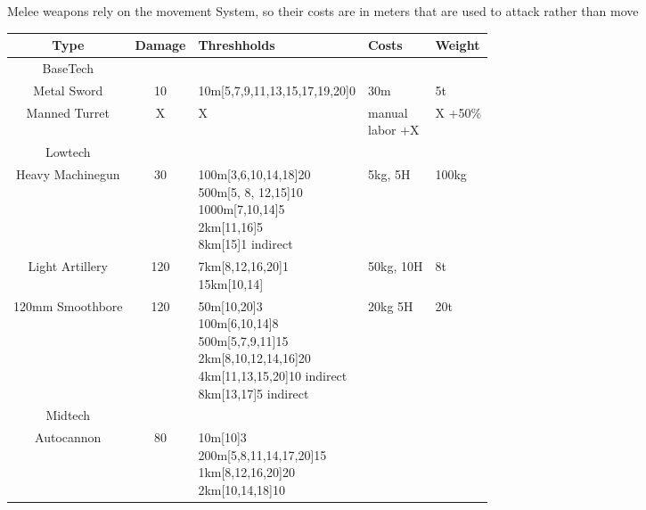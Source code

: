 Melee weapons rely on the movement System, so their costs are in meters that are used to attack rather than move\par
\begin{tabular}{c|clll}
    Type & Damage & Threshholds & Costs & Weight\\
    \hline \hline BaseTech&&&&\\
    \hline Metal Sword & 10 & 10m[5,7,9,11,13,15,17,19,20]0 & 30m & 5t \\
    \hline Manned Turret & X & X & \makecell[l]{manual \\labor +X} &  X +50\% \\
    \hline \hline Lowtech &&&&\\
    \hline Heavy Machinegun & 30 & \makecell[l]{100m[3,6,10,14,18]20\\
                                        500m[5, 8, 12,15]10\\
                                        1000m[7,10,14]5\\
                                        2km[11,16]5\\
                                        8km[15]1 indirect}
                                            & 5kg, 5H & 100kg \\
    \hline Light Artillery & 120 & \makecell[l]{7km[8,12,16,20]1 \\
                                        15km[10,14]}& 50kg, 10H & 8t  \\
    \hline 120mm Smoothbore & 120 & \makecell[l]{50m[10,20]3\\
                                        100m[6,10,14]8\\
                                        500m[5,7,9,11]15\\
                                        2km[8,10,12,14,16]20\\
                                        4km[11,13,15,20]10 indirect\\
                                        8km[13,17]5 indirect}
                                            & 20kg 5H & 20t \\
    \hline\hline Midtech &&&&\\
    \hline Autocannon & 80 & \makecell[l]{10m[10]3\\
                                  200m[5,8,11,14,17,20]15\\
                                  1km[8,12,16,20]20\\
                                  2km[10,14,18]10 \\
}
\end{tabular}
